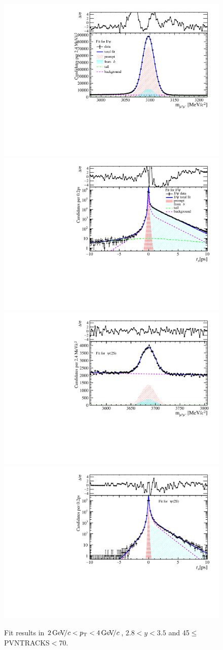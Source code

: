 \begin{figure}[H]
\begin{center}
\includegraphics[width=0.47\linewidth]{pdf/Jpsi/drawmass/n3y2pt2.pdf}
\includegraphics[width=0.47\linewidth]{pdf/Jpsi/2DFit/n3y2pt2.pdf}
\vspace*{-0.5cm}
\includegraphics[width=0.47\linewidth]{pdf/Psi2S/drawmass/n3y2pt2.pdf}
\includegraphics[width=0.47\linewidth]{pdf/Psi2S/2DFit/n3y2pt2.pdf}
\vspace*{-0.5cm}
\end{center}
\caption{Fit results in $2\text{\,Ge\kern -0.1em V\!/}c<p_{\mathrm{T}}<4\text{\,Ge\kern -0.1em V\!/}c$, $2.8<y<3.5$ and 45$\leq$PVNTRACKS$<$70.}
\label{Fitn3y2pt2}
\end{figure}

